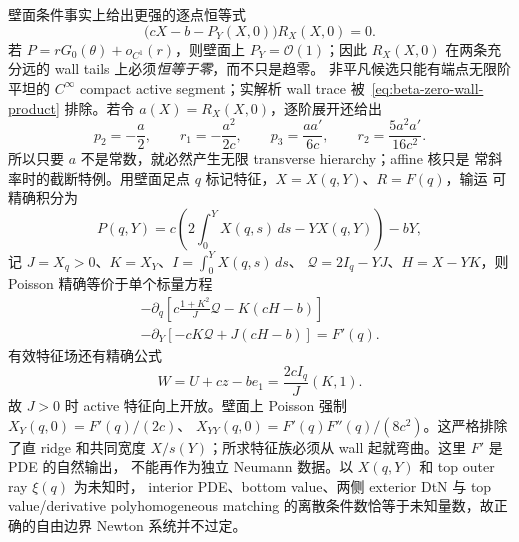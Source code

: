 \documentclass[11pt,a4paper,fontset=fandol]{ctexart}
\newcommand{\Order}{\mathcal O}
\begin{document}
壁面条件事实上给出更强的逐点恒等式
\begin{equation}
  \bigl(cX-b-P_Y(X,0)\bigr)R_X(X,0)=0.
  \label{eq:beta-zero-wall-product}
\end{equation}
若 $P=rG_0(\theta)+o_{C^1}(r)$，则壁面上 $P_Y=\Order(1)$；因此
$R_X(X,0)$ 在两条充分远的 wall tails 上必须\emph{恒等于零}，而不只是趋零。
非平凡候选只能有端点无限阶平坦的 $C^\infty$ compact active segment；实解析
wall trace 被~\eqref{eq:beta-zero-wall-product} 排除。若令
$a(X)=R_X(X,0)$，逐阶展开还给出
\begin{equation}
  p_2=-\frac a2,\qquad r_1=-\frac{a^2}{2c},\qquad
  p_3=\frac{aa'}{6c},\qquad
  r_2=\frac{5a^2a'}{16c^2}.
  \label{eq:beta-zero-wall-hierarchy}
\end{equation}
所以只要 $a$ 不是常数，就必然产生无限 transverse hierarchy；affine 核只是
常斜率时的截断特例。用壁面足点 $q$ 标记特征，$X=X(q,Y)$、$R=F(q)$，输运
可精确积分为
\begin{equation}
  P(q,Y)=c\left(2\int_0^YX(q,s)\,ds-YX(q,Y)\right)-bY,
  \label{eq:beta-zero-hodograph}
\end{equation}
记 $J=X_q>0$、$K=X_Y$、$I=\int_0^YX(q,s)\,ds$、
$\mathcal Q=2I_q-YJ$、$H=X-YK$，则 Poisson 精确等价于单个标量方程
\begin{multline}
 -\partial_q\left[c\frac{1+K^2}{J}\mathcal Q-K(cH-b)\right]\\
 -\partial_Y\left[-cK\mathcal Q+J(cH-b)\right]=F'(q).
 \label{eq:beta-zero-hodograph-pde}
\end{multline}
有效特征场还有精确公式
\begin{equation}
 W=U+cz-be_1=\frac{2cI_q}{J}(K,1).
 \label{eq:beta-zero-hodograph-field}
\end{equation}
故 $J>0$ 时 active 特征向上开放。壁面上 Poisson 强制
$X_Y(q,0)=F'(q)/(2c)$、
$X_{YY}(q,0)=F'(q)F''(q)/(8c^2)$。这严格排除了直 ridge 和共同宽度
$X/s(Y)$；所求特征族必须从 wall 起就弯曲。这里 $F'$ 是 PDE 的自然输出，
不能再作为独立 Neumann 数据。以 $X(q,Y)$ 和 top outer ray $\xi(q)$ 为未知时，
interior PDE、bottom value、两侧 exterior DtN 与 top value/derivative
polyhomogeneous matching 的离散条件数恰等于未知量数，故正确的自由边界
Newton 系统并不过定。
\end{document}
